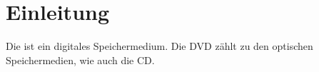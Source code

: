 \chapter{Einleitung}
\blindtext

\blindtext 

Die  ist ein digitales Speichermedium. Die \acl{DVD} zählt zu den optischen Speichermedien, wie auch die \ac{CD}.
